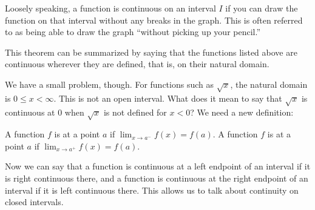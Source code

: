 \documentclass{ximera}
\begin{document}
Loosely speaking, a function is continuous on an interval $I$ if you
can draw the function on that interval without any breaks in the
graph.  This is often referred to as being able to draw the graph
``without picking up your pencil.''


This theorem can be summarized by saying that the functions listed above are continuous wherever they are defined, that is, on their natural domain. 

We have a small problem, though.  For functions such as $\sqrt{x}$, the natural domain is $0\leq x <\infty$.  This is not an open interval.  What does it mean to say that $\sqrt{x}$ is continuous at 0 when $\sqrt{x}$ is not defined for $x<0$?  We need a new definition:

\begin{definition}
  A function $f$ is  at a point $a$ if $\lim_{x\to a^-}
  f(x) = f(a)$.   A function $f$ is  at a point $a$ if $\lim_{x\to a^+}
  f(x) = f(a)$.  
\end{definition}

Now we can say that a function is continuous at a left endpoint of an interval if it is right continuous there, and a function is continuous at the right endpoint of an interval if it is left continuous there. This allows us to talk about continuity on closed intervals.  
\end{document}
